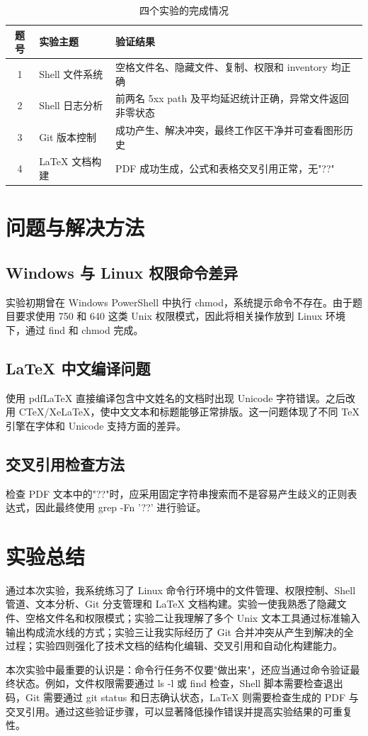 \documentclass[UTF8]{ctexart}
\begin{document}
\begin{table}[htbp]
\centering
\caption{四个实验的完成情况}
\label{tab:summary}
\begin{tabular}{cll}
\toprule
题号 & 实验主题 & 验证结果 \\
\midrule
1 & Shell 文件系统 & 空格文件名、隐藏文件、复制、权限和 inventory 均正确 \\
2 & Shell 日志分析 & 前两名 5xx path 及平均延迟统计正确，异常文件返回非零状态 \\
3 & Git 版本控制 & 成功产生、解决冲突，最终工作区干净并可查看图形历史 \\
4 & LaTeX 文档构建 & PDF 成功生成，公式和表格交叉引用正常，无"??" \\
\bottomrule
\end{tabular}
\end{table}

\section{问题与解决方法}

\subsection{Windows 与 Linux 权限命令差异}

实验初期曾在 Windows PowerShell 中执行 chmod，系统提示命令不存在。由于题目要求使用 750 和 640 这类 Unix 权限模式，因此将相关操作放到 Linux 环境下，通过 find 和 chmod 完成。

\subsection{LaTeX 中文编译问题}

使用 pdfLaTeX 直接编译包含中文姓名的文档时出现 Unicode 字符错误。之后改用 CTeX/XeLaTeX，使中文文本和标题能够正常排版。这一问题体现了不同 TeX 引擎在字体和 Unicode 支持方面的差异。

\subsection{交叉引用检查方法}

检查 PDF 文本中的"??"时，应采用固定字符串搜索而不是容易产生歧义的正则表达式，因此最终使用 grep -Fn '??' 进行验证。

\section{实验总结}

通过本次实验，我系统练习了 Linux 命令行环境中的文件管理、权限控制、Shell 管道、文本分析、Git 分支管理和 LaTeX 文档构建。实验一使我熟悉了隐藏文件、空格文件名和权限模式；实验二让我理解了多个 Unix 文本工具通过标准输入输出构成流水线的方式；实验三让我实际经历了 Git 合并冲突从产生到解决的全过程；实验四则强化了技术文档的结构化编辑、交叉引用和自动化构建能力。

本次实验中最重要的认识是：命令行任务不仅要"做出来"，还应当通过命令验证最终状态。例如，文件权限需要通过 ls -l 或 find 检查，Shell 脚本需要检查退出码，Git 需要通过 git status 和日志确认状态，LaTeX 则需要检查生成的 PDF 与交叉引用。通过这些验证步骤，可以显著降低操作错误并提高实验结果的可重复性。
\end{document}
